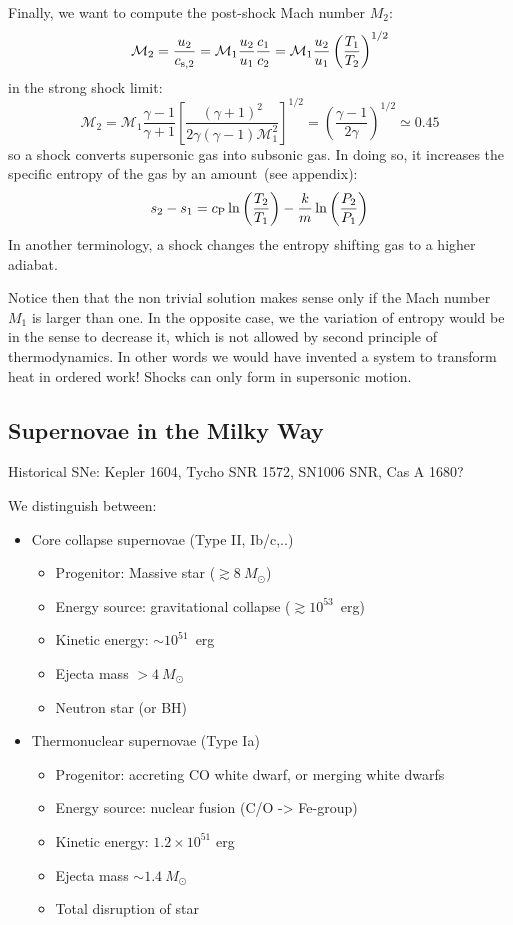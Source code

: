Finally, we want to compute the post-shock Mach number \( M_2 \):
%
\begin{equation}
\mathcal M_2 = \frac{u_2}{c_{\rm s,2}} = \mathcal M_1 \frac{u_2}{u_1} \frac{c_1}{c_2} = \mathcal M_1 \frac{u_2}{u_1} \left( \frac{T_1}{T_2} \right)^{1/2}
\end{equation}
%
in the strong shock limit:
%
\begin{equation}
\mathcal M_2 = \mathcal M_1 \frac{\gamma - 1}{\gamma + 1} \left[ \frac{(\gamma + 1)^2}{2\gamma(\gamma - 1) \mathcal M_1^2} \right]^{1/2} = \left( \frac{\gamma - 1}{2\gamma} \right)^{1/2} \simeq 0.45 
\end{equation}
%
so a shock converts supersonic gas into subsonic gas.
%
In doing so, it increases the specific entropy of the gas by an amount~(see appendix):
%
\begin{equation}
s_2 - s_1 = c_{\rm P} \ln \left(\frac{T_2}{T_1}\right) - \frac{k}{m} \ln \left( \frac{P_2}{P_1} \right)
\end{equation}
%
In another terminology, a shock changes the entropy shifting gas to a higher adiabat.

Notice then that the non trivial solution makes sense only if the Mach number $M_1$ is larger than one. In the opposite case, we the variation of entropy would be in the sense to decrease it, which is not allowed by second principle of thermodynamics. 
%
In other words we would have invented a system to transform heat in ordered work! Shocks can only form in supersonic motion.

\subsection{Supernovae in the Milky Way}

Historical SNe: Kepler 1604, {\color{red}Tycho SNR 1572}, SN1006 SNR, Cas A 1680?

We distinguish between: 
%
\begin{itemize}
\item Core collapse supernovae (Type II, Ib/c,..)
\begin{itemize}
\item Progenitor: Massive star (\( \gtrsim 8~M_\odot \))
\item Energy source: gravitational collapse (\( \gtrsim 10^{53} \)~erg) 
\item Kinetic energy: \( \sim 10^{51} \)~erg
\item Ejecta mass \( >4~M_\odot \)  
\item Neutron star (or BH)
\end{itemize}
\item Thermonuclear supernovae (Type Ia)
\begin{itemize}
\item Progenitor: accreting CO white dwarf, or merging white dwarfs 
\item Energy source: nuclear fusion (C/O -> Fe-group)
\item Kinetic energy: \( 1.2 \times 10^{51} \) erg
\item Ejecta mass \( \sim 1.4~M_\odot \)
\item Total disruption of star
\end{itemize}
\end{itemize}